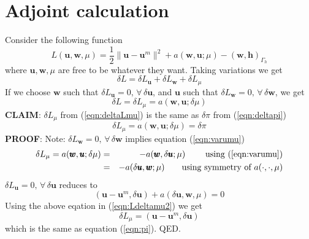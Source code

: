 \documentclass{article}
\newcommand{\beq}{\begin{equation}}
\newcommand{\eeq}{\end{equation}}
\newcommand{\ber}{\begin{eqnarray}}
\newcommand{\eer}{\end{eqnarray}}
\begin{document}
\section{Adjoint calculation}
Consider the following function
%
%
%
\beq
L(\pmb{u},\pmb{w},\mu) = \frac{1}{2}\|\pmb{u}-\pmb{u}^m\|^2 + a(\pmb{w},\pmb{u};\mu)-(\pmb{w},\pmb{h})_{\Gamma_h}
\eeq
where $\pmb{u},\pmb{w},\mu$ are free to be whatever they want. Taking variations we get
%
\beq
\delta{L} = \delta{L}_{\pmb{u}} + \delta{L}_{\pmb{w}} + \delta{L}_{\mu}
\eeq
%
If we choose $\pmb{w}$ such that $\delta{L}_{\pmb{u}}=0,\,\forall\,\delta\pmb{u}$, and $\pmb{u}$ such that $\delta{L}_{\pmb{w}}=0,\,\forall\,\delta\pmb{w}$, we get
%
\beq
\label{eqn:deltaLmu}
\delta{L} = \delta{L}_{\mu} = a(\pmb{w},\pmb{u};\delta\mu)
\eeq
%
\textbf{CLAIM}: $\delta{L}_{\mu}$ from (\ref{eqn:deltaLmu}) is the same as $\delta{\pi}$ from (\ref{eqn:deltapi})
\beq
\delta{L}_{\mu} = a(\pmb{w},\pmb{u};\delta\mu) = \delta{\pi}
\eeq
%
\textbf{PROOF}:
Note: $\delta{L}_{\pmb{w}}=0,\,\forall\,\delta\pmb{w}$ implies equation (\ref{eqn:varumu})
\ber
\delta{L}_{\mu} = a(\pmb{w},\pmb{u};\delta\mu) &=& -a(\pmb{w},\delta\pmb{u};\mu) \qquad \text{ using } (\ref{eqn:varumu}) \\
\label{eqn:Ldeltamu2}
&=& -a(\delta\pmb{u},\pmb{w};\mu) \qquad \text{using symmetry of } a(\cdot,\cdot,\mu) 
\eer
$\delta{L}_{\pmb{u}}=0,\,\forall\,\delta\pmb{u}$ reduces to 
\beq
(\pmb{u}-\pmb{u}^m,\delta{\pmb{u}}) + a(\delta\pmb{u},\pmb{w},\mu) = 0
\eeq
Using the above eqation in (\ref{eqn:Ldeltamu2}) we get
\beq
\delta{L}_{\mu} = (\pmb{u}-\pmb{u}^m,\delta{\pmb{u}})
\eeq
which is the same as equation (\ref{eqn:pi}). QED.
%
%
\end{document}
